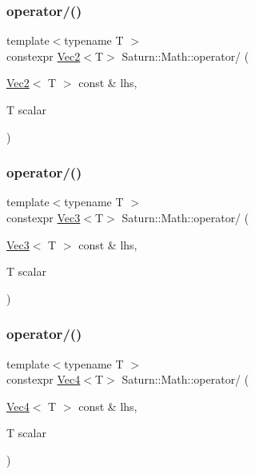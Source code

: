 \subsubsection{\texorpdfstring{operator/()}{operator/()}\hspace{0.1cm}{\footnotesize\ttfamily [2/4]}}
{\footnotesize\ttfamily template$<$typename T $>$ \\
constexpr \mbox{\hyperlink{namespace_saturn_1_1_math_a8befc95aeff660bda92b8807c1cc5224}{Vec2}}$<$T$>$ Saturn\+::\+Math\+::operator/ (\begin{DoxyParamCaption}\item[{\mbox{\hyperlink{namespace_saturn_1_1_math_a8befc95aeff660bda92b8807c1cc5224}{Vec2}}$<$ T $>$ const \&}]{lhs,  }\item[{T}]{scalar }\end{DoxyParamCaption})}

\mbox{\label{namespace_saturn_1_1_math_a367f6c2acfeddaefbe7a5b9ac3492b58}} 
\subsubsection{\texorpdfstring{operator/()}{operator/()}\hspace{0.1cm}{\footnotesize\ttfamily [3/4]}}
{\footnotesize\ttfamily template$<$typename T $>$ \\
constexpr \mbox{\hyperlink{namespace_saturn_1_1_math_af4a7a893730c64ac02b620f648cc5406}{Vec3}}$<$T$>$ Saturn\+::\+Math\+::operator/ (\begin{DoxyParamCaption}\item[{\mbox{\hyperlink{namespace_saturn_1_1_math_af4a7a893730c64ac02b620f648cc5406}{Vec3}}$<$ T $>$ const \&}]{lhs,  }\item[{T}]{scalar }\end{DoxyParamCaption})}

\mbox{\label{namespace_saturn_1_1_math_a10c2fa86db458a948933e3ed17707b2f}} 
\subsubsection{\texorpdfstring{operator/()}{operator/()}\hspace{0.1cm}{\footnotesize\ttfamily [4/4]}}
{\footnotesize\ttfamily template$<$typename T $>$ \\
constexpr \mbox{\hyperlink{namespace_saturn_1_1_math_a311b3d690ef397050af7963caa08d1bd}{Vec4}}$<$T$>$ Saturn\+::\+Math\+::operator/ (\begin{DoxyParamCaption}\item[{\mbox{\hyperlink{namespace_saturn_1_1_math_a311b3d690ef397050af7963caa08d1bd}{Vec4}}$<$ T $>$ const \&}]{lhs,  }\item[{T}]{scalar }\end{DoxyParamCaption})}

